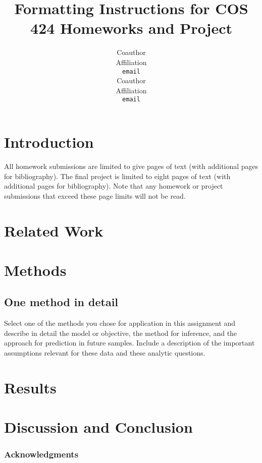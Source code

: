 \documentclass{article} %
\title{Formatting Instructions for COS 424 Homeworks and Project}
\author{
Coauthor\\
Affiliation\\
\texttt{email} \\
\And
Coauthor \\
Affiliation \\
\texttt{email} \\
}
\begin{document}
\maketitle

\begin{abstract}

\end{abstract}

\section{Introduction}

All homework submissions are limited to give pages of text (with additional pages for bibliography). The final project is limited to eight pages of text (with additional pages for bibliography). Note that any homework or project submissions that exceed these page limits will not be read.

\section{Related Work}

\section{Methods}

\subsection{One method in detail}

Select one of the methods you chose for application in this assignment and describe in detail the model or objective, the method for inference, and the approach for prediction in future samples. Include a description of the important assumptions relevant for these data and these analytic questions.

\section{Results}

\section{Discussion and Conclusion}

\subsubsection*{Acknowledgments}




\end{document}
